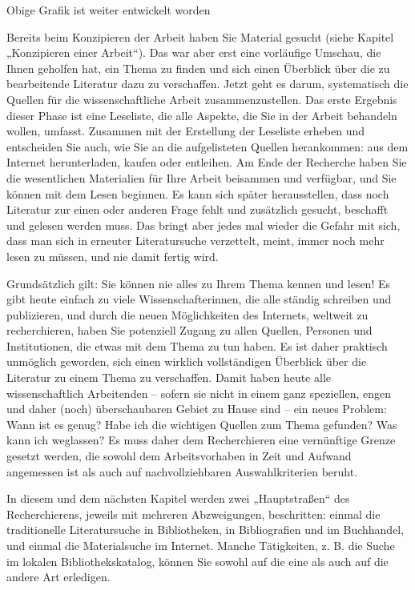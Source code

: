 \documentclass[]{book}
\theoremstyle{definition}
\theoremstyle{definition}
\theoremstyle{definition}
\theoremstyle{remark}
\begin{document}
Obige Grafik \citep{xie2015} ist weiter entwickelt worden

Bereits beim Konzipieren der Arbeit haben Sie Material gesucht (siehe
Kapitel „Konzipieren einer Arbeit``). Das war aber erst eine vorläufige
Umschau, die Ihnen geholfen hat, ein Thema zu finden und sich einen
Überblick über die zu bearbeitende Literatur dazu zu verschaffen. Jetzt
geht es darum, systematisch die Quellen für die wissenschaftliche Arbeit
zusammenzustellen. Das erste Ergebnis dieser Phase ist eine Leseliste,
die alle Aspekte, die Sie in der Arbeit behandeln wollen, umfasst.
Zusammen mit der Erstellung der Leseliste erheben und entscheiden Sie
auch, wie Sie an die aufgelisteten Quellen herankommen: aus dem Internet
herunterladen, kaufen oder entleihen. Am Ende der Recherche haben Sie
die wesentlichen Materialien für Ihre Arbeit beisammen und verfügbar,
und Sie können mit dem Lesen beginnen. Es kann sich später
herausstellen, dass noch Literatur zur einen oder anderen Frage fehlt
und zusätzlich gesucht, beschafft und gelesen werden muss. Das bringt
aber jedes mal wieder die Gefahr mit sich, dass man sich in erneuter
Literatursuche verzettelt, meint, immer noch mehr lesen zu müssen, und
nie damit fertig wird.

Grundsätzlich gilt: Sie können nie alles zu Ihrem Thema kennen und
lesen! Es gibt heute einfach zu viele Wissenschafterinnen, die alle
ständig schreiben und publizieren, und durch die neuen Möglichkeiten des
Internets, weltweit zu recherchieren, haben Sie potenziell Zugang zu
allen Quellen, Personen und Institutionen, die etwas mit dem Thema zu
tun haben. Es ist daher praktisch unmöglich geworden, sich einen
wirklich vollständigen Überblick über die Literatur zu einem Thema zu
verschaffen. Damit haben heute alle wissenschaftlich Arbeitenden --
sofern sie nicht in einem ganz speziellen, engen und daher (noch)
überschaubaren Gebiet zu Hause sind -- ein neues Problem: Wann ist es
genug? Habe ich die wichtigen Quellen zum Thema gefunden? Was kann ich
weglassen? Es muss daher dem Recherchieren eine vernünftige Grenze
gesetzt werden, die sowohl dem Arbeitsvorhaben in Zeit und Aufwand
angemessen ist als auch auf nachvollziehbaren Auswahlkriterien beruht.

In diesem und dem nächsten Kapitel werden zwei „Hauptstraßen`` des
Recherchierens, jeweils mit mehreren Abzweigungen, beschritten: einmal
die traditionelle Literatursuche in Bibliotheken, in Bibliografien und
im Buchhandel, und einmal die Materialsuche im Internet. Manche
Tätigkeiten, z. B. die Suche im lokalen Bibliothekskatalog, können Sie
sowohl auf die eine als auch auf die andere Art erledigen.
\end{document}
